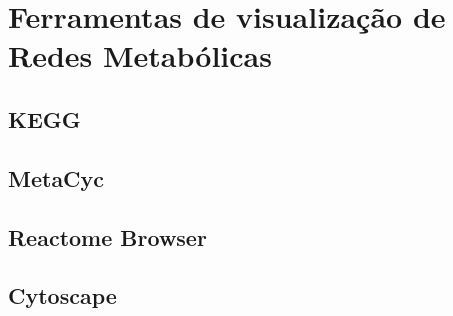 \chapter{Ferramentas de visualização de Redes Metabólicas}


\section{KEGG}

\section{MetaCyc}

\section{Reactome Browser}

\section{Cytoscape}

